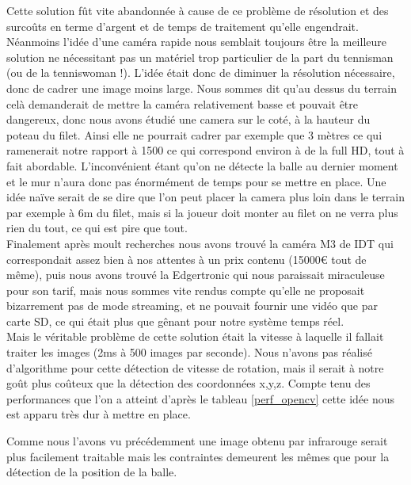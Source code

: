 Cette solution fût vite abandonnée à cause de ce problème de résolution et des surcoûts en terme d'argent et de temps de traitement qu'elle engendrait. Néanmoins l'idée d'une caméra rapide nous semblait toujours être la meilleure solution ne nécessitant pas un matériel trop particulier de la part du tennisman (ou de la tenniswoman !). L'idée était donc de diminuer la résolution nécessaire, donc de cadrer une image moins large. Nous sommes dit qu'au dessus du terrain celà demanderait de mettre la caméra relativement basse et pouvait être dangereux, donc nous avons étudié une camera sur le coté, à la hauteur du poteau du filet. Ainsi elle ne pourrait cadrer par exemple que 3 mètres ce qui ramenerait notre rapport à 1500 ce qui correspond environ à de la full HD, tout à fait abordable. L'inconvénient étant qu'on ne détecte la balle au dernier moment et le mur n'aura donc pas énormément de temps pour se mettre en place. Une idée naïve serait de se dire que l'on peut placer la camera plus loin dans le terrain par exemple à 6m du filet, mais si la joueur doit monter au filet on ne verra plus rien du tout, ce qui est pire que tout.\\

Finalement après moult recherches nous avons trouvé la caméra M3 de IDT qui correspondait assez bien à nos attentes à un prix contenu (15000€ tout de même), puis nous avons trouvé la Edgertronic qui nous paraissait miraculeuse pour son tarif, mais nous sommes vite rendus compte qu'elle ne proposait bizarrement pas de mode streaming, et ne pouvait fournir une vidéo que par carte SD, ce qui était plus que gênant pour notre système temps réel.\\

Mais le véritable problème de cette solution était la vitesse à laquelle il fallait traiter les images (2ms à 500 images par seconde). Nous n'avons pas réalisé d'algorithme pour cette détection de vitesse de rotation, mais il serait à notre goût plus coûteux que la détection des coordonnées x,y,z. Compte tenu des performances que l'on a atteint d'après le tableau \ref{perf_opencv} cette idée nous est apparu très dur à mettre en place.




Comme nous l'avons vu précédemment une image obtenu par infrarouge serait plus facilement traitable mais les contraintes demeurent les mêmes que pour la détection de la position de la balle.





